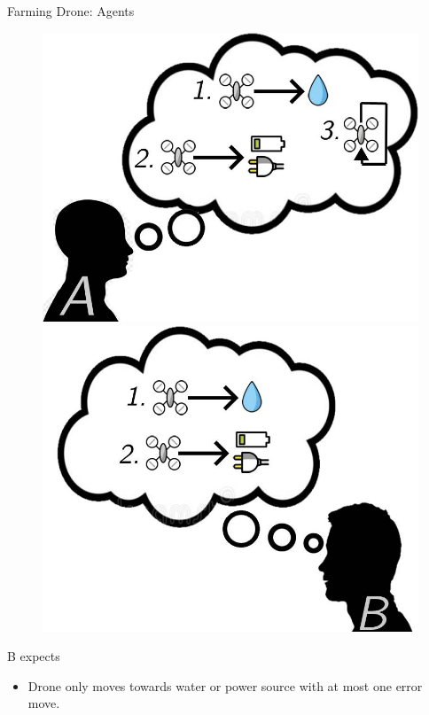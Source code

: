 \documentclass{beamer}
\begin{document}
\begin{frame}{Farming Drone: Agents}
    \begin{figure}
        \centering
        \includegraphics[scale=0.2]{images/a-expects-patrol.jpg}
        \includegraphics[scale=0.2]{images/b-expects-move.jpg}
    \end{figure}
    B expects
    \begin{itemize}
        \item Drone only moves towards water or power source with at most one error move.
    \end{itemize}
\end{frame}
\end{document}
